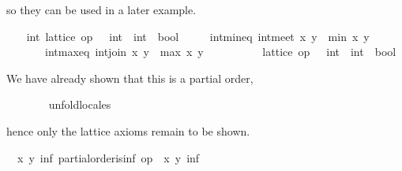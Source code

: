 \begin{isabellebody}
\begin{isamarkuptext}
  so they can be used in a later example.%
\end{isamarkuptext}%
\isamarkuptrue%
%
\isadelimvisible
\ \ %
\endisadelimvisible
%
\isatagvisible
{}\isamarkupfalse%
\ int{}\ lattice\ {}op\ {}\ {}{}\ int\ {}\ int\ {}\ bool{}\isanewline
\ \ \ \ \ int{}min{}eq{}\ {}int{}meet\ x\ y\ {}\ min\ x\ y{}\isanewline
\ \ \ \ \ \ \ int{}max{}eq{}\ {}int{}join\ x\ y\ {}\ max\ x\ y{}\isanewline
\ \ \isamarkupfalse%
\ {}\isanewline
\ \ \ \ \isamarkupfalse%
\ {}lattice\ {}op\ {}\ {}{}\ int\ {}\ int\ {}\ bool{}{}%
\begin{isamarkuptxt}%
\normalsize We have already shown that this is a partial
        order,%
\end{isamarkuptxt}%
\isamarkuptrue%
\ \ \ \ \ \ \isamarkupfalse%
\ unfold{}locales%
\begin{isamarkuptxt}%
\normalsize hence only the lattice axioms remain to be
        shown.
        \begin{isabelle}%
\ {}{}\ {}x\ y{}\ {}inf{}\ partial{}order{}is{}inf\ op\ {}\ x\ y\ inf\isanewline

\end{isabelle}
\end{isamarkuptxt}
\end{isabellebody}
